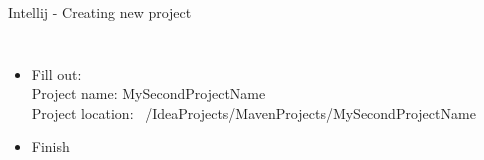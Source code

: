 \documentclass[aspectratio=1610,english]{beamer} %
\begin{document}
\begin{frame}{Intellij - Creating new project}
\begin{columns}
				\begin{minipage}{\textwidth}
				\end{minipage}				
				
				\begin{itemize}
					\tiny
					\color{black}
					\item Fill out: \\
					\fontsize{4}{5} \selectfont 
					\color{gray}
					Project name: MySecondProjectName \\
					Project location: ~/IdeaProjects/MavenProjects/MySecondProjectName
					\color{black}
					\tiny
					\item Finish \\
					\color{gray}
				\end{itemize}
				
		\end{columns}
	\end{frame}
\end{document}
